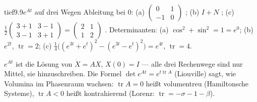\begin{loesungkarte}{tief}{9.9}{$e^{At}$ auf drei Wegen}
Ableitung bei $0$: (a) $\begin{pmatrix}0&1\\-1&0\end{pmatrix}$ \checkmark; (b) $I + N$ \checkmark; (c) $\frac12\begin{pmatrix}3 + 1&3 - 1\\3 - 1&3 + 1\end{pmatrix} = \begin{pmatrix}2&1\\1&2\end{pmatrix}$ \checkmark. Determinanten: (a) $\cos^{2} + \sin^{2} = 1 = e^{0}$; (b) $e^{2t}$, $\operatorname{tr} = 2$; (c) $\frac14\bigl((e^{3t} + e^{t})^{2} - (e^{3t} - e^{t})^{2}\bigr) = e^{4t}$, $\operatorname{tr} = 4$. \checkmark
\begin{mitnehmen}\kastentext
$e^{At}$ ist die Lösung von $\dot X = AX$, $X(0) = I$ --- alle drei Rechenwege sind nur Mittel, sie hinzuschreiben. Die Formel $\det e^{At} = e^{t\operatorname{tr}A}$ (Liouville) sagt, wie Volumina im Phasenraum wachsen: $\operatorname{tr}A = 0$ heißt volumentreu (Hamiltonsche Systeme), $\operatorname{tr}A < 0$ heißt kontrahierend (Lorenz: $\operatorname{tr} = -\sigma - 1 - \beta$).
\end{mitnehmen}
\end{loesungkarte}

